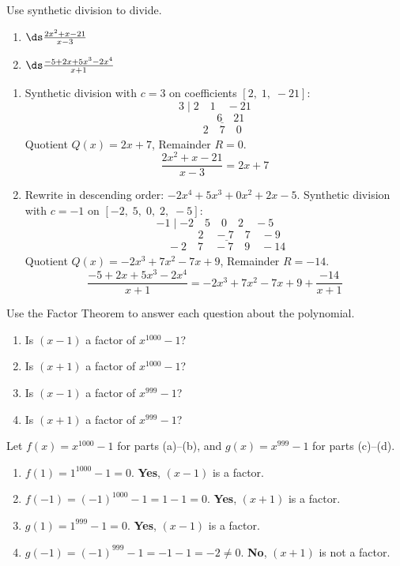 \documentclass{ximera}
\begin{document}
\begin{problem}
Use synthetic division to divide.
\begin{enumerate}
  \item[(a)] $\ds\frac{2x^2+x-21}{x-3}$
  \medskip
  \item[(b)] $\ds\frac{-5+2x+5x^3-2x^4}{x+1}$
\end{enumerate}

\begin{solution}
\begin{enumerate}
  \item[(a)] Synthetic division with $c=3$ on coefficients $[2,\;1,\;-21]$:
  $$3 \mid 2 \quad 1 \quad -21$$
  $$\phantom{3 \mid} \underline{\phantom{2}\quad 6 \quad 21}$$
  $$\phantom{3 \mid} 2 \quad 7 \quad 0$$
  Quotient $Q(x) = 2x+7$, Remainder $R = 0$.
  $$\frac{2x^2+x-21}{x-3} = 2x+7$$

  \item[(b)] Rewrite in descending order: $-2x^4+5x^3+0x^2+2x-5$. Synthetic division with $c=-1$ on $[-2,\;5,\;0,\;2,\;-5]$:
  $$-1 \mid -2 \quad 5 \quad 0 \quad 2 \quad -5$$
  $$\phantom{-1 \mid}\underline{\phantom{-2}\quad 2 \quad -7 \quad 7 \quad -9}$$
  $$\phantom{-1 \mid}-2 \quad 7 \quad -7 \quad 9 \quad -14$$
  Quotient $Q(x) = -2x^3+7x^2-7x+9$, Remainder $R = -14$.
  $$\frac{-5+2x+5x^3-2x^4}{x+1} = -2x^3+7x^2-7x+9+\frac{-14}{x+1}$$
\end{enumerate}
\end{solution}
\end{problem}


\begin{problem}
Use the Factor Theorem to answer each question about the polynomial.
\begin{enumerate}
  \item[(a)] Is $(x-1)$ a factor of $x^{1000} - 1$?
  \medskip
  \item[(b)] Is $(x+1)$ a factor of $x^{1000} - 1$?
  \medskip
  \item[(c)] Is $(x-1)$ a factor of $x^{999} - 1$?
  \medskip
  \item[(d)] Is $(x+1)$ a factor of $x^{999} - 1$?
\end{enumerate}

\begin{solution}
Let $f(x) = x^{1000}-1$ for parts (a)--(b), and $g(x) = x^{999}-1$ for parts (c)--(d).
\begin{enumerate}
  \item[(a)] $f(1) = 1^{1000}-1 = 0$. \textbf{Yes}, $(x-1)$ is a factor.

  \item[(b)] $f(-1) = (-1)^{1000}-1 = 1-1 = 0$. \textbf{Yes}, $(x+1)$ is a factor.

  \item[(c)] $g(1) = 1^{999}-1 = 0$. \textbf{Yes}, $(x-1)$ is a factor.

  \item[(d)] $g(-1) = (-1)^{999}-1 = -1-1 = -2 \neq 0$. \textbf{No}, $(x+1)$ is not a factor.
\end{enumerate}
\end{solution}
\end{problem}
\end{document}
